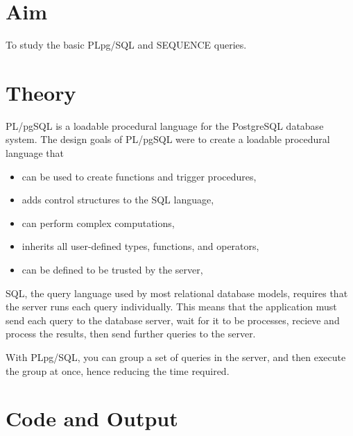 \section{Aim}
 To study the basic PLpg/SQL and SEQUENCE queries.

\section{{Theory}}

PL/pgSQL is a loadable procedural language for the PostgreSQL database system. The design goals of PL/pgSQL were to create a loadable procedural language that

\begin{itemize}
    \item can be used to create functions and trigger procedures,
    \item adds control structures to the SQL language,
    \item can perform complex computations,
    \item inherits all user-defined types, functions, and operators,
    \item can be defined to be trusted by the server,
\end{itemize}

SQL, the query language used by most relational database models, requires that the server runs each query individually. This means that the application must send each query to the database server, wait for it to be processes, recieve and process the results, then send further queries to the server. 

With PLpg/SQL, you can group a set of queries in the server, and then execute the group at once, hence reducing the time required. 

\section{{Code and Output}}

